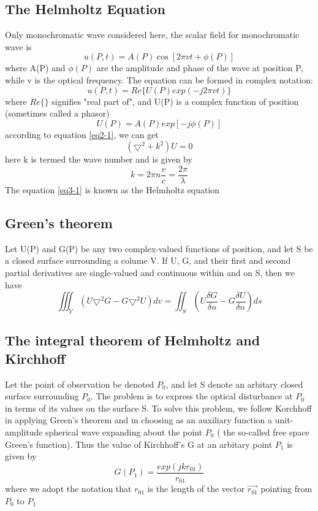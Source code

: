 \documentclass[../main.tex]{subfiles}
\begin{document}
	\subsection{The Helmholtz Equation}
	Only monochromatic wave considered here, the scalar field for monochromatic wave is 
	\begin{equation}
	u(P,t)=A(P)\cos{[2\pi vt+\phi(P)]}
	\end{equation}
	where A(P) and $\phi(P)$ are the amplitude and phase of the wave at position P, while v is the optical frequency. The equation can be formed in complex notation:
	\begin{equation}
	u(P,t)=Re{\{U(P)exp(-j2\pi vt)\}}
	\end{equation}
	where $Re{\{\}}$ signifies "real part of", and U(P) is a complex function of position (sometimes called a phasor)
	\begin{equation}
	U(P)=A(P)exp[-j\phi(P)]
	\end{equation}
	according to equation \ref{eq2-1}, we can get 
	\begin{equation}
	(\boldsymbol{\bigtriangledown}^2+k^2)U=0
	\label{eq3-1}
	\end{equation}
	here k is termed the wave number and is given by
	\begin{equation}
	k=2\pi n \frac{v}{c}=\frac{2\pi}{\lambda}
	\end{equation}
	The equation \ref{eq3-1} is known as the Helmholtz equation

	\subsection{Green's theorem}
	Let U(P) and G(P) be any two complex-valued functions of position, and let S be a closed surface surrounding a colume V. If U, G, and their first and second partial derivatives are single-valued and continuous within and on S, then we have
	\begin{equation}
	\iiint_V (U\boldsymbol{\bigtriangledown}^2G-G\boldsymbol{\bigtriangledown}^2U)dv=\iint_S (U\frac{\delta G}{\delta n}-G\frac{\delta U}{\delta n})ds
	\end{equation}

	\subsection{The integral theorem of Helmholtz and Kirchhoff}
	Let the point of observation be denoted $P_0$, and let S denote an arbitary closed surface surrounding $P_0$. The problem is to express the optical disturbance at $P_0$ in terms of its values on the surface S. To solve this problem, we follow Korchhoff in applying Green's theorem and in choosing as an auxiliary function a unit-amplitude spherical wave expanding about the point $P_0$ ( the so-called free space Green's function). Thus the value of Kirchhoff's G at an arbitary point $P_1$ is given by 
	\begin{equation}
	G(P_1)=\frac{exp(jkr_{01})}{r_{01}}
	\end{equation}
	where we adopt the notation that $r_{01}$ is the length of the vector $\vec{r_{01}}$ pointing from $P_0$ to $P_1$
\end{document}
